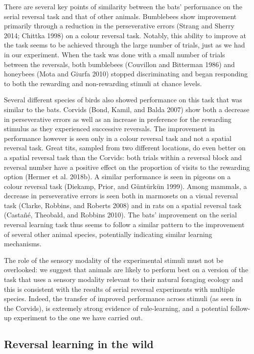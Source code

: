 \documentclass[
]{article}
\begin{document}
There are several key points of similarity between the bats' performance on the serial reversal task and that of other animals. Bumblebees show improvement primarily through a reduction in the perseverative errors (Strang and Sherry 2014; Chittka 1998) on a colour reversal task. Notably, this ability to improve at the task seems to be achieved through the large number of trials, just as we had in our experiment. When the task was done with a small number of trials between the reversals, both bumblebees (Couvillon and Bitterman 1986) and honeybees (Mota and Giurfa 2010) stopped discriminating and began responding to both the rewarding and non-rewarding stimuli at chance levels.

Several different species of birds also showed performance on this task that was similar to the bats. Corvids (Bond, Kamil, and Balda 2007) show both a decrease in perseverative errors as well as an increase in preference for the rewarding stimulus as they experienced successive reversals. The improvement in performance however is seen only in a colour reversal task and not a spatial reversal task. Great tits, sampled from two different locations, do even better on a spatial reversal task than the Corvids: both trials within a reversal block and reversal number have a positive effect on the proportion of visits to the rewarding option (Hermer et al. 2018b). A similar performance is seen in pigeons on a colour reversal task (Diekamp, Prior, and Güntürkün 1999). Among mammals, a decrease in perseverative errors is seen both in marmosets on a visual reversal task (Clarke, Robbins, and Roberts 2008) and in rats on a spatial reversal task (Castañé, Theobald, and Robbins 2010). The bats' improvement on the serial reversal learning task thus seems to follow a similar pattern to the improvement of several other animal species, potentially indicating similar learning mechanisms.

The role of the sensory modality of the experimental stimuli must not be overlooked: we suggest that animals are likely to perform best on a version of the task that uses a sensory modality relevant to their natural foraging ecology and this is consistent with the results of serial reversal experiments with multiple species. Indeed, the transfer of improved performance across stimuli (as seen in the Corvids), is extremely strong evidence of rule-learning, and a potential follow-up experiment to the one we have carried out.

\hypertarget{reversal-learning-in-the-wild}{%
\subsection{Reversal learning in the wild}\label{reversal-learning-in-the-wild}}
\end{document}
